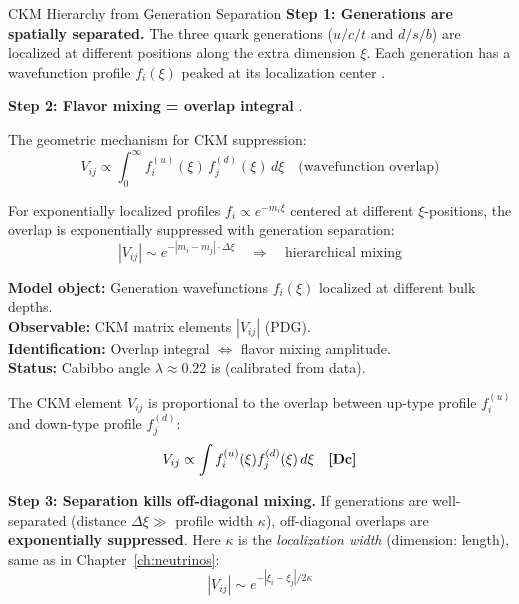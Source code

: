 \begin{mechanism}{CKM Hierarchy from Generation Separation}
\textbf{Step 1: Generations are spatially separated.}
The three quark generations ($u/c/t$ and $d/s/b$) are localized at different
positions along the extra dimension $\xi$. Each generation has a wavefunction
profile $f_i(\xi)$ peaked at its localization center \tagP{}.

\textbf{Step 2: Flavor mixing = overlap integral} \tagDc{}.

The geometric mechanism for CKM suppression:
\begin{equation}
V_{ij} \propto \int_0^\infty f_i^{(u)}(\xi) \, f_j^{(d)}(\xi) \, d\xi
\quad\text{(wavefunction overlap)}
\end{equation}

For exponentially localized profiles $f_i \propto e^{-m_i \xi}$ centered at different $\xi$-positions,
the overlap is exponentially suppressed with generation separation:
\begin{equation}
|V_{ij}| \sim e^{-|m_i - m_j| \cdot \Delta\xi} \quad \Rightarrow \quad
\text{hierarchical mixing}
\end{equation}

\begin{tcolorbox}[colback=yellow!5, colframe=yellow!50!black,
  title=\textbf{Dictionary: Overlap $\to$ CKM Element}]
\tagDc{}
\textbf{Model object:} Generation wavefunctions $f_i(\xi)$ localized at different bulk depths.\\
\textbf{Observable:} CKM matrix elements $|V_{ij}|$ (PDG).\\
\textbf{Identification:} Overlap integral $\Leftrightarrow$ flavor mixing amplitude.\\
\textbf{Status:} Cabibbo angle $\lambda \approx 0.22$ is \tagCal{} (calibrated from data).
\end{tcolorbox}

The CKM element $V_{ij}$ is proportional to the overlap between up-type profile
$f_i^{(u)}$ and down-type profile $f_j^{(d)}$:
\begin{equation}
    V_{ij} \propto \int f_i^{(u)}(\xi) f_j^{(d)}(\xi) \, d\xi
    \quad \textbf{[Dc]}{}
\end{equation}

\textbf{Step 3: Separation kills off-diagonal mixing.}
If generations are well-separated (distance $\Delta\xi \gg$ profile width $\kappa$),
off-diagonal overlaps are \textbf{exponentially suppressed}.
Here $\kappa$ is the \emph{localization width} (dimension: length), same as in Chapter~\ref{ch:neutrinos}:
\begin{equation}
    |V_{ij}| \sim e^{-|\xi_i - \xi_j|/2\kappa}
\end{equation}


\end{mechanism}
